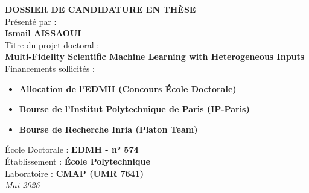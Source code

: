 \documentclass[a4paper,12pt]{article}
\begin{document}
\begin{center}
    \vspace*{2cm}
    
    {\Huge\bfseries\color{titleblue} DOSSIER DE CANDIDATURE EN THÈSE}\\[2cm]
    
    {\Large Présenté par :}\\[0.5cm]
    {\huge\bfseries Ismail AISSAOUI}\\[2cm]
    
    {\Large Titre du projet doctoral :}\\[0.5cm]
    {\Large\bfseries Multi-Fidelity Scientific Machine Learning with Heterogeneous Inputs}\\[2cm]
    
    {\Large Financements sollicités :}\\[0.5cm]
    \begin{itemize}
        \item[] \textbf{Allocation de l'EDMH (Concours École Doctorale)}
        \item[] \textbf{Bourse de l'Institut Polytechnique de Paris (IP-Paris)}
        \item[] \textbf{Bourse de Recherche Inria (Platon Team)}
    \end{itemize}

    \vfill
    
    {\Large École Doctorale : \textbf{EDMH - n° 574}}\\[0.3cm]
    {\Large Établissement : \textbf{École Polytechnique}}\\[0.3cm]
    {\Large Laboratoire : \textbf{CMAP (UMR 7641)}}\\[2cm]
    
    \textit{Mai 2026}
\end{center}
\end{document}
